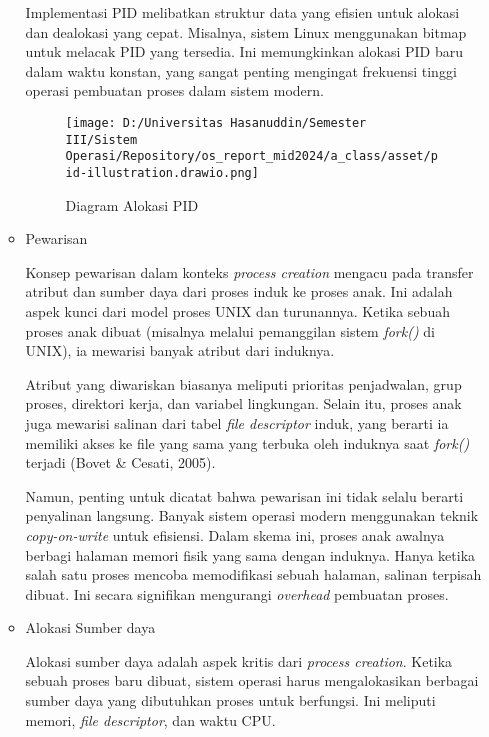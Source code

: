 \documentclass[12pt]{article}
\begin{document}
\begin{itemize}
\begin{itemize}
        Implementasi PID melibatkan struktur data yang efisien 
        untuk alokasi dan dealokasi yang cepat. Misalnya, sistem 
        Linux menggunakan bitmap untuk melacak PID yang tersedia. 
        Ini memungkinkan alokasi PID baru dalam waktu konstan, 
        yang sangat penting mengingat frekuensi tinggi operasi 
        pembuatan proses dalam sistem modern.

        \begin{figure}[h]
            \centering
            \texttt{[image: D:/Universitas Hasanuddin/Semester III/Sistem Operasi/Repository/os\_report\_mid2024/a\_class/asset/pid-illustration.drawio.png]}
            \caption{Diagram Alokasi PID}
        \end{figure}

        \item Pewarisan
        
        Konsep pewarisan dalam konteks \textit{process creation} 
        mengacu pada transfer atribut dan sumber daya dari proses 
        induk ke proses anak. Ini adalah aspek kunci dari model 
        proses UNIX dan turunannya. Ketika sebuah proses anak 
        dibuat (misalnya melalui pemanggilan sistem 
        \textit{fork()} di UNIX), ia mewarisi banyak atribut dari 
        induknya.

        Atribut yang diwariskan biasanya meliputi prioritas 
        penjadwalan, grup proses, direktori kerja, dan variabel 
        lingkungan. Selain itu, proses anak juga mewarisi salinan 
        dari tabel \textit{file descriptor} induk, yang berarti 
        ia memiliki akses ke file yang sama yang terbuka oleh 
        induknya saat \textit{fork()} terjadi (Bovet \& Cesati, 
        2005).

        Namun, penting untuk dicatat bahwa pewarisan ini tidak 
        selalu berarti penyalinan langsung. Banyak sistem operasi 
        modern menggunakan teknik \textit{copy-on-write} untuk 
        efisiensi. Dalam skema ini, proses anak awalnya berbagi 
        halaman memori fisik yang sama dengan induknya. Hanya 
        ketika salah satu proses mencoba memodifikasi sebuah 
        halaman, salinan terpisah dibuat. Ini secara signifikan 
        mengurangi \textit{overhead} pembuatan proses.

        \item Alokasi Sumber daya
        
        Alokasi sumber daya adalah aspek kritis dari 
        \textit{process creation}. Ketika sebuah proses baru 
        dibuat, sistem operasi harus mengalokasikan berbagai 
        sumber daya yang dibutuhkan proses untuk berfungsi. Ini 
        meliputi memori, \textit{file descriptor}, dan waktu CPU.


\end{itemize}
\end{itemize}
\end{document}
